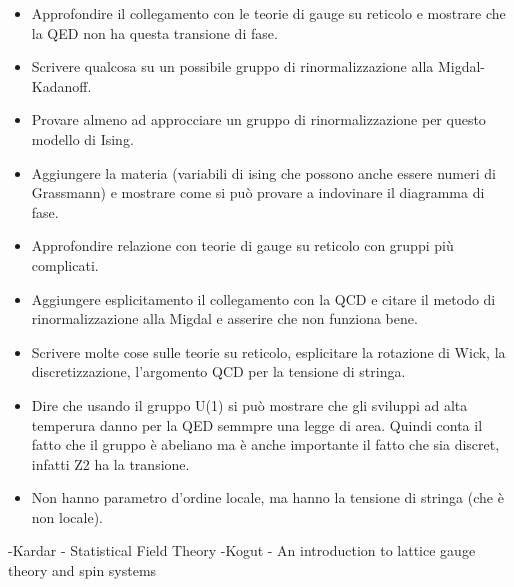 \documentclass[12pt,a4paper]{article}
\begin{document}
\begin{itemize}
\item Approfondire il collegamento con le teorie di gauge su reticolo e mostrare che la QED non ha questa transione di fase. 
\item Scrivere qualcosa su un possibile gruppo di rinormalizzazione alla Migdal-Kadanoff.
\item Provare almeno ad approcciare un gruppo di rinormalizzazione per questo modello di Ising.
\item Aggiungere la materia (variabili di ising che possono anche essere numeri di Grassmann) e mostrare come si può provare a indovinare il diagramma di fase.
\item Approfondire relazione con teorie di gauge su reticolo con gruppi più complicati.
\item Aggiungere esplicitamento il collegamento con la QCD e citare il metodo di rinormalizzazione alla Migdal e asserire che non funziona bene. 
\item Scrivere molte cose sulle teorie su reticolo, esplicitare la rotazione di Wick, la discretizzazione, l'argomento QCD per la tensione di stringa. 
\item Dire che usando il gruppo U(1) si può mostrare che gli sviluppi ad alta temperura danno per la QED semmpre una legge di area. Quindi conta il fatto che il gruppo è abeliano ma è anche importante il fatto che sia discret, infatti Z2 ha la transione.
\item Non hanno parametro d'ordine locale, ma hanno la tensione di stringa (che è non locale).
\end{itemize}

\begin{thebibliography}{99} %


\bibitem -Kardar - Statistical Field Theory
\bibitem -Kogut - An introduction to lattice gauge theory and spin systems

\end{thebibliography}

\clearpage
\printindex
\end{document}
